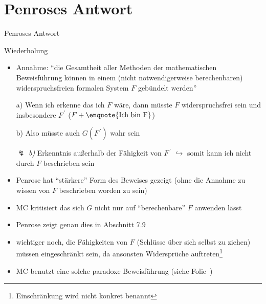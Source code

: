%
%

\section{Penroses Antwort}
\label{sec:penrose_answer}


\begin{frame}{Penroses Antwort \cite{penrose1996beyond}}
    \begin{block}{Wiederholung}
        \begin{itemize}
            \item Annahme: \enquote{die Gesamtheit aller Methoden der mathematischen Beweisführung können in einem (nicht notwendigerweise berechenbaren) widerspruchsfreien formalen System $F$ gebündelt werden}
        \end{itemize}
    \end{block}
    \begin{itemize}
        \item[a)] Wenn ich erkenne das ich $F$ wäre, dann müsste $F$ widerspruchsfrei sein und insbesondere $F^{\,'}$ ($F+\text{\enquote{Ich bin F}}$)
        \item[b)] Also müsste auch $G(F^{\,'})$ wahr sein
        \item[$\lightning$] \emph{b)} Erkenntnis außerhalb der Fähigkeit von $F^{\,'}$ $\hookrightarrow$ somit kann ich nicht durch $F$ beschrieben sein
        \item Penrose hat \enquote{stärkere} Form des Beweises gezeigt (ohne die Annahme zu wissen von $F$ beschrieben worden zu sein)
    \end{itemize}
\end{frame}

\begin{frame}
    \begin{itemize}
        \item MC kritisiert das sich $G$ nicht nur auf \enquote{berechenbare} $F$ anwenden lässt
        \item Penrose zeigt genau dies in Abschnitt 7.9
        \item wichtiger noch, die Fähigkeiten von $F$ (Schlüsse über sich selbst zu ziehen) müssen eingeschränkt sein, da ansonsten Widersprüche auftreten\footnote{Einschränkung wird nicht konkret benannt}
        \item MC benutzt eine solche paradoxe Beweisführung (siehe Folie~\pageref{sec:quick_and_dirty})
    \end{itemize}
\end{frame}

